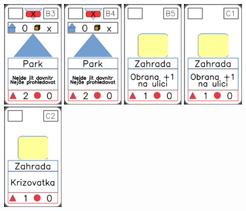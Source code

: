 \documentclass[a4paper]{article}
\begin{document}
	\includegraphics[width=3.0cm]{img-2_22}
	\includegraphics[width=3.0cm]{img-2_23}
	\includegraphics[width=3.0cm]{img-2_24}
	\includegraphics[width=3.0cm]{img-2_25}
	\includegraphics[width=3.0cm]{img-2_26}
\end{document}
